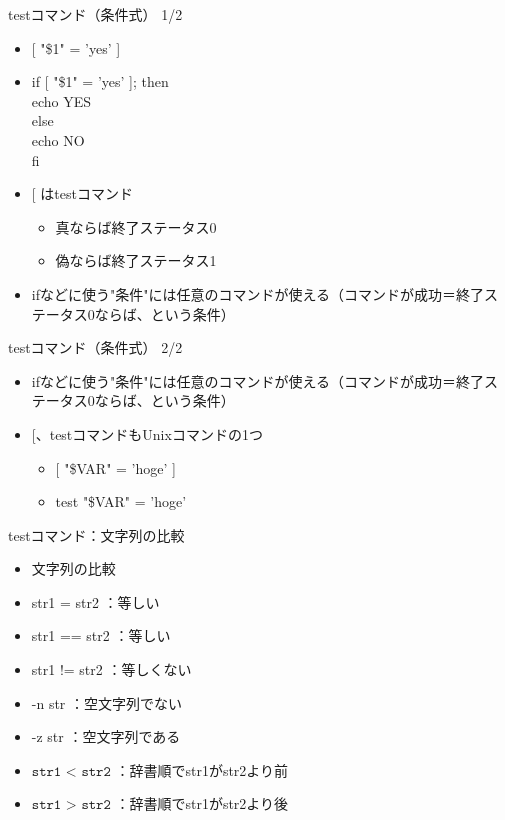 \documentclass[12pt,aspectratio=169]{beamer}
\begin{document}
\begin{frame}{testコマンド（条件式） 1/2}

  \begin{itemize}
    \item {[ "\$1" = 'yes' ]}
    \item
      {if [ "\$1" = 'yes' ]; then \\
        \hspace{0.5cm}echo YES \\
      else \\
        \hspace{0.5cm}echo NO \\
      fi}
    \vspace{0.5cm}
    \item {[ はtestコマンド}
      \begin{itemize}
        \item 真ならば終了ステータス0
        \item 偽ならば終了ステータス1
      \end{itemize}
    \item ifなどに使う"条件"には任意のコマンドが使える（コマンドが成功＝終了ステータス0ならば、という条件）
  \end{itemize}

\end{frame}

\begin{frame}{testコマンド（条件式） 2/2}

  \begin{itemize}
    \item ifなどに使う"条件"には任意のコマンドが使える（コマンドが成功＝終了ステータス0ならば、という条件）
    \item {[、testコマンドもUnixコマンドの1つ}
      \begin{itemize}
        \item {[ "\$VAR" = 'hoge' ]}
        \item {test "\$VAR" = 'hoge'}
      \end{itemize}

  \end{itemize}

\end{frame}

\begin{frame}{testコマンド：文字列の比較}

  \begin{itemize}
    \item 文字列の比較
    \item str1 = str2 ：等しい
    \item str1 == str2 ：等しい
    \item str1 != str2 ：等しくない
    \item -n str ：空文字列でない
    \item -z str ：空文字列である
    \item $\texttt{str1 < str2}$ ：辞書順でstr1がstr2より前
    \item $\texttt{str1 > str2}$ ：辞書順でstr1がstr2より後
  \end{itemize}

\end{frame}
\end{document}
